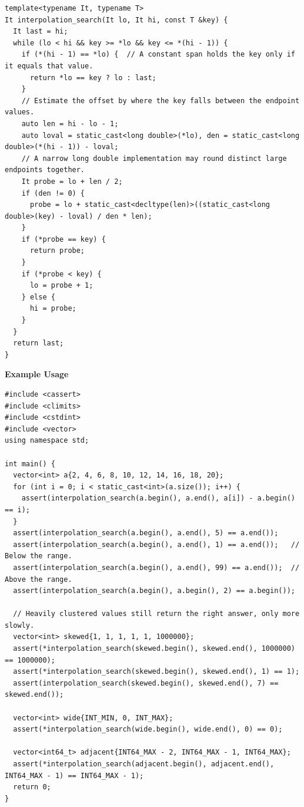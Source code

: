 \begin{lstlisting}[style=cpp]
template<typename It, typename T>
It interpolation_search(It lo, It hi, const T &key) {
  It last = hi;
  while (lo < hi && key >= *lo && key <= *(hi - 1)) {
    if (*(hi - 1) == *lo) {  // A constant span holds the key only if it equals that value.
      return *lo == key ? lo : last;
    }
    // Estimate the offset by where the key falls between the endpoint values.
    auto len = hi - lo - 1;
    auto loval = static_cast<long double>(*lo), den = static_cast<long double>(*(hi - 1)) - loval;
    // A narrow long double implementation may round distinct large endpoints together.
    It probe = lo + len / 2;
    if (den != 0) {
      probe = lo + static_cast<decltype(len)>((static_cast<long double>(key) - loval) / den * len);
    }
    if (*probe == key) {
      return probe;
    }
    if (*probe < key) {
      lo = probe + 1;
    } else {
      hi = probe;
    }
  }
  return last;
}
\end{lstlisting}
\textbf{Example Usage}\par
\begin{lstlisting}[style=cpp]
#include <cassert>
#include <climits>
#include <cstdint>
#include <vector>
using namespace std;

int main() {
  vector<int> a{2, 4, 6, 8, 10, 12, 14, 16, 18, 20};
  for (int i = 0; i < static_cast<int>(a.size()); i++) {
    assert(interpolation_search(a.begin(), a.end(), a[i]) - a.begin() == i);
  }
  assert(interpolation_search(a.begin(), a.end(), 5) == a.end());
  assert(interpolation_search(a.begin(), a.end(), 1) == a.end());   // Below the range.
  assert(interpolation_search(a.begin(), a.end(), 99) == a.end());  // Above the range.
  assert(interpolation_search(a.begin(), a.begin(), 2) == a.begin());

  // Heavily clustered values still return the right answer, only more slowly.
  vector<int> skewed{1, 1, 1, 1, 1, 1000000};
  assert(*interpolation_search(skewed.begin(), skewed.end(), 1000000) == 1000000);
  assert(*interpolation_search(skewed.begin(), skewed.end(), 1) == 1);
  assert(interpolation_search(skewed.begin(), skewed.end(), 7) == skewed.end());

  vector<int> wide{INT_MIN, 0, INT_MAX};
  assert(*interpolation_search(wide.begin(), wide.end(), 0) == 0);

  vector<int64_t> adjacent{INT64_MAX - 2, INT64_MAX - 1, INT64_MAX};
  assert(*interpolation_search(adjacent.begin(), adjacent.end(), INT64_MAX - 1) == INT64_MAX - 1);
  return 0;
}
\end{lstlisting}
